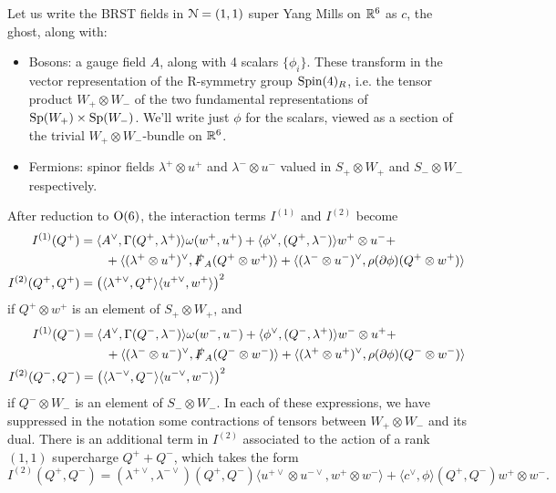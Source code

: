\documentclass[10pt, oneside]{article}
\begin{document}
Let us write the BRST fields in $\mathcal{N}=(1,1)$ super Yang Mills on $\mathbb R^6$ as $c$, the ghost, along with:
\begin{itemize}
 \item Bosons: a gauge field $A$, along with 4 scalars $\{\phi_i\}$.  These transform in the vector representation of the R-symmetry group $\mathrm{Spin}(4)_R$, i.e. the tensor product $W_+ \otimes W_-$ of the two fundamental representations of $\mathrm{Sp}(W_+) \times \mathrm{Sp}(W_-)$.  We'll write just $\phi$ for the scalars, viewed as a section of the trivial $W_+ \otimes W_-$-bundle on $\mathbb R^6$.
 \item Fermions: spinor fields $\lambda^+ \otimes u^+$ and $\lambda^- \otimes u^-$ valued in $S_+ \otimes W_+$ and $S_- \otimes W_-$ respectively.
\end{itemize}

\begin{prop} \label{O6_decomposition_of_susy_prop}
After reduction to $\mathrm{O}(6)$, the interaction terms $I^{(1)}$ and $I^{(2)}$ become
\begin{align*}
I^{(1)}(Q^+) &= \langle A^\vee, \Gamma(Q^+, \lambda^+)\rangle\omega(w^+,u^+) + \langle \phi^\vee, (Q^+,\lambda^-)\rangle w^+ \otimes u^- + \\&\qquad + \langle (\lambda^{+} \otimes u^+)^\vee, \slashed{F}_A (Q^+ \otimes w^+) \rangle + \langle (\lambda^{-} \otimes u^-)^\vee, \rho(\partial \phi)(Q^+ \otimes w^+) \rangle\\
I^{(2)}(Q^+, Q^+) &= \left(\langle\lambda^{+\vee},Q^+\rangle\langle u^{+\vee}, w^+ \rangle\right)^2
\end{align*}
if $Q^+ \otimes w^+$ is an element of $S_+ \otimes W_+$, and
\begin{align*}
I^{(1)}(Q^-) &= \langle A^\vee, \Gamma(Q^-, \lambda^-)\rangle\omega(w^-,u^-) + \langle \phi^\vee, (Q^-,\lambda^+)\rangle w^- \otimes u^+ + \\&\qquad + \langle (\lambda^{-} \otimes u^-)^\vee, \slashed{F}_A (Q^- \otimes w^-) \rangle + \langle (\lambda^{+} \otimes u^+)^\vee, \rho(\partial \phi)(Q^- \otimes w^-) \rangle\\
I^{(2)}(Q^-, Q^-) &= \left(\langle\lambda^{-\vee},Q^-\rangle\langle u^{-\vee}, w^- \rangle\right)^2
\end{align*}
if $Q^- \otimes W_-$ is an element of $S_- \otimes W_-$.  In each of these expressions, we have suppressed in the notation some contractions of tensors between $W_+ \otimes W_-$ and its dual.  There is an additional term in $I^{(2)}$ associated to the action of a rank $(1,1)$ supercharge $Q^+ + Q^-$, which takes the form
\[I^{(2)}(Q^+, Q^-) = (\lambda^{+\vee}, \lambda^{-\vee})(Q^+,Q^-) \langle u^{+\vee} \otimes u^{-\vee}, w^+ \otimes w^-\rangle + \langle c^\vee, \phi \rangle(Q^+,Q^-) w^+ \otimes w^-. \]
\end{prop}
\end{document}
